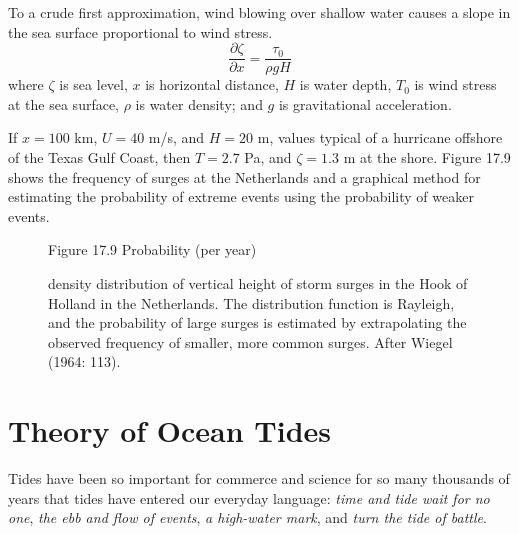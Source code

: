 To a crude first approximation, wind blowing over shallow water causes
a slope in the sea surface proportional to wind stress.
\begin{equation}
\frac{\partial \zeta }{\partial x}= \frac{\tau _{0}}{\rho g H}
\end{equation}
where $\zeta $ is sea level, $x$ is horizontal distance, $H$ is water
depth, $T_{0}$ is wind stress at the sea surface, $\rho $ is water
density; and $g$ is gravitational acceleration.

If $x=100$ km, $U=40$ m/s, and $H=20$ m, values typical of a hurricane
offshore of the Texas Gulf Coast, then $T= 2.7$ Pa, and $\zeta = 1.3$
m at the shore. Figure 17.9 shows the frequency of surges at the
Netherlands and a graphical method for estimating the probability of
extreme events using the probability of weaker events.

\begin{figure}[t!]
\footnotesize
Figure 17.9 Probability (per year) \rule{0mm}{3ex}density distribution
of vertical height of storm surges in the Hook of Holland in the
Netherlands. The distribution function is Rayleigh, and the
probability of large surges is estimated by extrapolating the observed
frequency of smaller, more common surges. After Wiegel (1964: 113).
\label{fig:surgeprob}
\vspace{-3ex}
\end{figure}

\section{Theory of Ocean Tides}
 Tides have been so important for commerce
and science for so many thousands of years that tides have entered our
everyday language: \textit{time and tide wait for no one}, \textit{the
  ebb and flow of events}, \textit{a high-water mark}, and
\textit{turn the tide of battle}.

